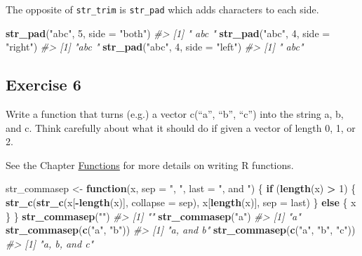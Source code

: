 \documentclass[]{book}
\newenvironment{Shaded}{\begin{snugshade}}{\end{snugshade}}
\newcommand{\CommentTok}[1]{\textcolor[rgb]{0.56,0.35,0.01}{\textit{#1}}}
\newcommand{\ControlFlowTok}[1]{\textcolor[rgb]{0.13,0.29,0.53}{\textbf{#1}}}
\newcommand{\DataTypeTok}[1]{\textcolor[rgb]{0.13,0.29,0.53}{#1}}
\newcommand{\DecValTok}[1]{\textcolor[rgb]{0.00,0.00,0.81}{#1}}
\newcommand{\KeywordTok}[1]{\textcolor[rgb]{0.13,0.29,0.53}{\textbf{#1}}}
\newcommand{\NormalTok}[1]{#1}
\newcommand{\OperatorTok}[1]{\textcolor[rgb]{0.81,0.36,0.00}{\textbf{#1}}}
\newcommand{\StringTok}[1]{\textcolor[rgb]{0.31,0.60,0.02}{#1}}
\theoremstyle{definition}
\theoremstyle{definition}
\theoremstyle{definition}
\theoremstyle{remark}
\begin{document}
The opposite of \texttt{str\_trim} is \texttt{str\_pad} which adds
characters to each side.

\begin{Shaded}
\begin{Highlighting}[]
\KeywordTok{str_pad}\NormalTok{(}\StringTok{"abc"}\NormalTok{, }\DecValTok{5}\NormalTok{, }\DataTypeTok{side =} \StringTok{"both"}\NormalTok{)}
\CommentTok{#> [1] " abc "}
\KeywordTok{str_pad}\NormalTok{(}\StringTok{"abc"}\NormalTok{, }\DecValTok{4}\NormalTok{, }\DataTypeTok{side =} \StringTok{"right"}\NormalTok{)}
\CommentTok{#> [1] "abc "}
\KeywordTok{str_pad}\NormalTok{(}\StringTok{"abc"}\NormalTok{, }\DecValTok{4}\NormalTok{, }\DataTypeTok{side =} \StringTok{"left"}\NormalTok{)}
\CommentTok{#> [1] " abc"}
\end{Highlighting}
\end{Shaded}

\hypertarget{exercise-6-7}{%
\subsection{Exercise 6}\label{exercise-6-7}}

Write a function that turns (e.g.) a vector c(``a'', ``b'', ``c'') into
the string a, b, and c. Think carefully about what it should do if given
a vector of length 0, 1, or 2.

See the Chapter \protect\hyperlink{functions}{Functions} for more
details on writing R functions.

\begin{Shaded}
\begin{Highlighting}[]
\NormalTok{str_commasep <-}\StringTok{ }\ControlFlowTok{function}\NormalTok{(x, }\DataTypeTok{sep =} \StringTok{", "}\NormalTok{, }\DataTypeTok{last =} \StringTok{", and "}\NormalTok{) \{}
  \ControlFlowTok{if}\NormalTok{ (}\KeywordTok{length}\NormalTok{(x) }\OperatorTok{>}\StringTok{ }\DecValTok{1}\NormalTok{) \{}
    \KeywordTok{str_c}\NormalTok{(}\KeywordTok{str_c}\NormalTok{(x[}\OperatorTok{-}\KeywordTok{length}\NormalTok{(x)], }\DataTypeTok{collapse =}\NormalTok{ sep),}
\NormalTok{                x[}\KeywordTok{length}\NormalTok{(x)],}
                \DataTypeTok{sep =}\NormalTok{ last)}
\NormalTok{  \} }\ControlFlowTok{else}\NormalTok{ \{}
\NormalTok{    x}
\NormalTok{  \}}
\NormalTok{\}}
\KeywordTok{str_commasep}\NormalTok{(}\StringTok{""}\NormalTok{)}
\CommentTok{#> [1] ""}
\KeywordTok{str_commasep}\NormalTok{(}\StringTok{"a"}\NormalTok{)}
\CommentTok{#> [1] "a"}
\KeywordTok{str_commasep}\NormalTok{(}\KeywordTok{c}\NormalTok{(}\StringTok{"a"}\NormalTok{, }\StringTok{"b"}\NormalTok{))}
\CommentTok{#> [1] "a, and b"}
\KeywordTok{str_commasep}\NormalTok{(}\KeywordTok{c}\NormalTok{(}\StringTok{"a"}\NormalTok{, }\StringTok{"b"}\NormalTok{, }\StringTok{"c"}\NormalTok{))}
\CommentTok{#> [1] "a, b, and c"}
\end{Highlighting}
\end{Shaded}
\end{document}

